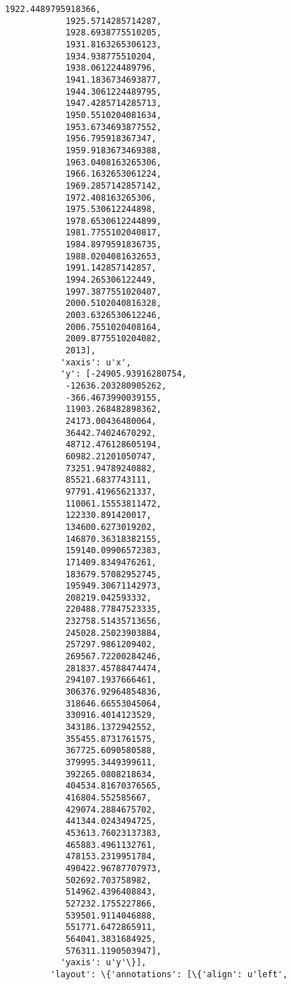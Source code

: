 \documentclass{article}
\begin{document}
\begin{Verbatim}[commandchars=\\\{\}]
            1922.4489795918366,
            1925.5714285714287,
            1928.6938775510205,
            1931.8163265306123,
            1934.938775510204,
            1938.061224489796,
            1941.1836734693877,
            1944.3061224489795,
            1947.4285714285713,
            1950.5510204081634,
            1953.6734693877552,
            1956.795918367347,
            1959.9183673469388,
            1963.0408163265306,
            1966.1632653061224,
            1969.2857142857142,
            1972.408163265306,
            1975.530612244898,
            1978.6530612244899,
            1981.7755102040817,
            1984.8979591836735,
            1988.0204081632653,
            1991.142857142857,
            1994.265306122449,
            1997.3877551020407,
            2000.5102040816328,
            2003.6326530612246,
            2006.7551020408164,
            2009.8775510204082,
            2013],
           'xaxis': u'x',
           'y': [-24905.93916280754,
            -12636.203280905262,
            -366.4673990039155,
            11903.268482898362,
            24173.00436480064,
            36442.74024670292,
            48712.476128605194,
            60982.21201050747,
            73251.94789240882,
            85521.6837743111,
            97791.41965621337,
            110061.15553811472,
            122330.891420017,
            134600.6273019202,
            146870.36318382155,
            159140.09906572383,
            171409.8349476261,
            183679.57082952745,
            195949.30671142973,
            208219.042593332,
            220488.77847523335,
            232758.51435713656,
            245028.25023903884,
            257297.9861209402,
            269567.72200284246,
            281837.45788474474,
            294107.1937666461,
            306376.92964854836,
            318646.66553045064,
            330916.4014123529,
            343186.1372942552,
            355455.8731761575,
            367725.6090580588,
            379995.3449399611,
            392265.0808218634,
            404534.81670376565,
            416804.552585667,
            429074.2884675702,
            441344.0243494725,
            453613.76023137383,
            465883.4961132761,
            478153.2319951784,
            490422.96787707973,
            502692.703758982,
            514962.4396408843,
            527232.1755227866,
            539501.9114046888,
            551771.6472865911,
            564041.3831684925,
            576311.1190503947],
           'yaxis': u'y'\}],
         'layout': \{'annotations': [\{'align': u'left',

\end{Verbatim}
\end{document}

